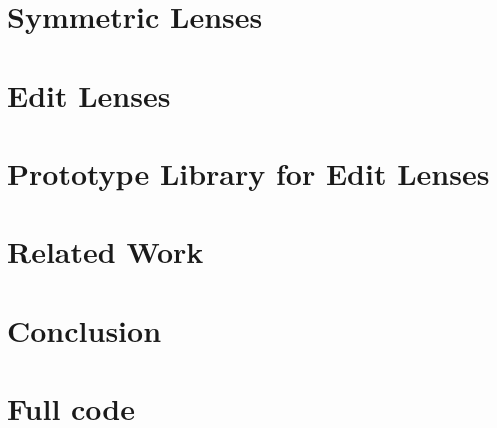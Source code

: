 \documentclass[12pt]{report}
\numberwithin{equation}{section}
\begin{document}


\chapter{Symmetric Lenses}
\label{chap:complement}
\label{chap:symmetric}
\label{chap:symmetry}
\label{chap:symm}



\chapter{Edit Lenses}
\label{chap:delta}
\label{chap:edits}
\label{chap:edit}

\mlinjargs\mlinjnoargs

%
%
%
%
%

\ifimpl
\chapter{Prototype Library for Edit Lenses}
\label{chap:implementation}
\label{chap:impl}


\fi%

\chapter{Related Work}
\label{chap:related}



\chapter{Conclusion}
\label{chap:conclusion}
\label{chap:conc}



\appendix
\chapter{Full code}
\label{app:code}
\footnotesize

\normalsize



\end{document}
